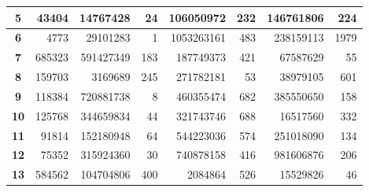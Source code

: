 \documentclass[12pt]{article}
\begin{document}
\begin{table}[!htbp]
{\begin{tabular}{crrrrrrr}
\multicolumn{1}{|c|}{\textbf{5}} & \multicolumn{1}{r|}{43404} & \multicolumn{1}{r|}{14767428} & \multicolumn{1}{r|}{24} & \multicolumn{1}{r|}{106050972} & \multicolumn{1}{r|}{232} & \multicolumn{1}{r|}{146761806} & \multicolumn{1}{r|}{224} \\ \hline
\multicolumn{1}{|c|}{\textbf{6}} & \multicolumn{1}{r|}{4773} & \multicolumn{1}{r|}{29101283} & \multicolumn{1}{r|}{1} & \multicolumn{1}{r|}{1053263161} & \multicolumn{1}{r|}{483} & \multicolumn{1}{r|}{238159113} & \multicolumn{1}{r|}{1979} \\ \hline
\multicolumn{1}{|c|}{\textbf{7}} & \multicolumn{1}{r|}{685323} & \multicolumn{1}{r|}{591427349} & \multicolumn{1}{r|}{183} & \multicolumn{1}{r|}{187749373} & \multicolumn{1}{r|}{421} & \multicolumn{1}{r|}{67587629} & \multicolumn{1}{r|}{55} \\ \hline
\multicolumn{1}{|c|}{\textbf{8}} & \multicolumn{1}{r|}{159703} & \multicolumn{1}{r|}{3169689} & \multicolumn{1}{r|}{245} & \multicolumn{1}{r|}{271782181} & \multicolumn{1}{r|}{53} & \multicolumn{1}{r|}{38979105} & \multicolumn{1}{r|}{601} \\ \hline
\multicolumn{1}{|c|}{\textbf{9}} & \multicolumn{1}{r|}{118384} & \multicolumn{1}{r|}{720881738} & \multicolumn{1}{r|}{8} & \multicolumn{1}{r|}{460355474} & \multicolumn{1}{r|}{682} & \multicolumn{1}{r|}{385550650} & \multicolumn{1}{r|}{158} \\ \hline
\multicolumn{1}{|c|}{\textbf{10}} & \multicolumn{1}{r|}{125768} & \multicolumn{1}{r|}{344659834} & \multicolumn{1}{r|}{44} & \multicolumn{1}{r|}{321743746} & \multicolumn{1}{r|}{688} & \multicolumn{1}{r|}{16517560} & \multicolumn{1}{r|}{332} \\ \hline
\multicolumn{1}{|c|}{\textbf{11}} & \multicolumn{1}{r|}{91814} & \multicolumn{1}{r|}{152180948} & \multicolumn{1}{r|}{64} & \multicolumn{1}{r|}{544223036} & \multicolumn{1}{r|}{574} & \multicolumn{1}{r|}{251018090} & \multicolumn{1}{r|}{134} \\ \hline
\multicolumn{1}{|c|}{\textbf{12}} & \multicolumn{1}{r|}{75352} & \multicolumn{1}{r|}{315924360} & \multicolumn{1}{r|}{30} & \multicolumn{1}{r|}{740878158} & \multicolumn{1}{r|}{416} & \multicolumn{1}{r|}{981606876} & \multicolumn{1}{r|}{206} \\ \hline
\multicolumn{1}{|c|}{\textbf{13}} & \multicolumn{1}{r|}{584562} & \multicolumn{1}{r|}{104704806} & \multicolumn{1}{r|}{400} & \multicolumn{1}{r|}{2084864} & \multicolumn{1}{r|}{526} & \multicolumn{1}{r|}{15529826} & \multicolumn{1}{r|}{46} \\ \hline

\end{tabular}}
\end{table}
\end{document}
